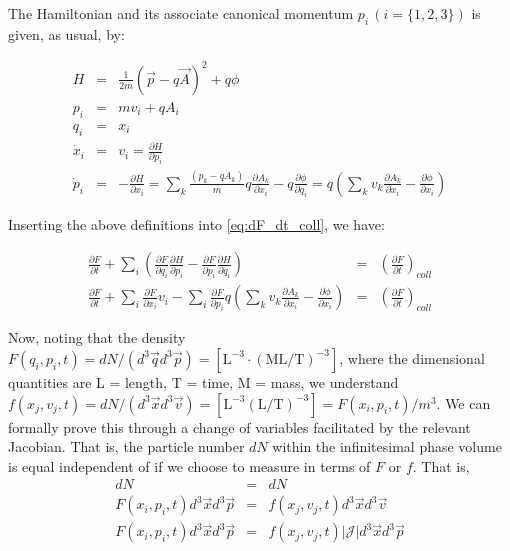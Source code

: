 \documentclass[11pt,titlepage]{report}
\begin{document}
\noindent The Hamiltonian and its associate canonical momentum $p_i \,(i = \{1,2,3\})$ is given, as usual, by:

\begin{eqnarray*}
H & = & \frac{1}{2m}(\vec{p} - q\vec{A})^2 + q\phi \\
p_i & = & mv_i + qA_i \\
q_i & = & x_i \\
\dot{x}_i & = & v_i = \frac{\partial H}{\partial p_i} \\
\dot{p}_i & = & -\frac{\partial H}{\partial x_i} = \sum_k\frac{(p_k - qA_k)}{m} q\frac{\partial A_k}{\partial x_i} - q\frac{\partial \phi }{\partial q_i} = q\left(\sum_kv_k\frac{\partial A_k}{\partial x_i} - \frac{\partial \phi }{\partial x_i}\right)
\end{eqnarray*}

\noindent Inserting the above definitions into \eqref{eq:dF_dt_coll}, we have:

\begin{eqnarray}
\frac{\partial F}{\partial t} + \sum_i \left(\frac{\partial F}{\partial q_i}\frac{\partial H}{\partial p_i} - \frac{\partial F}{\partial p_i}\frac{\partial H}{\partial q_i}\right) & =  & \left(\frac{\partial F}{\partial t}\right)_{coll}  \nonumber \\
\frac{\partial F}{\partial t} + \sum_i \frac{\partial F}{\partial x_i}v_i - \sum_i\frac{\partial F}{\partial p_i}q\left(\sum_kv_k\frac{\partial A_k}{\partial x_i} - \frac{\partial \phi }{\partial x_i}\right) & = & \left(\frac{\partial F}{\partial t}\right)_{coll} \label{eq:dF_dt_coll2}
\end{eqnarray}

Now, noting that the density $F(q_i,p_i,t) = dN / (d^3\vec{q}d^3\vec{p}) = \mathrm{[L^{-3} \cdot (M L/T)^{-3}]}$, where the dimensional quantities are L = length, T = time, M = mass, we understand $f(x_j,v_j,t) = dN / (d^3\vec{x}d^3\vec{v}) = \mathrm{[L^{-3} (L/T)^{-3}]} = F(x_i,p_i,t) / m^3$. We can formally prove this through a change of variables facilitated by the relevant Jacobian. That is, the particle number $dN$ within the infinitesimal phase volume is equal independent of if we choose to measure in terms of $F$ or $f$. That is,
\begin{eqnarray}
dN & = & dN \nonumber \\
F(x_i,p_i,t)d^3\vec{x}d^3\vec{p} & = & f(x_j,v_j,t) d^3\vec{x}d^3\vec{v}\nonumber  \\
F(x_i,p_i,t)d^3\vec{x}d^3\vec{p} & = & f(x_j,v_j,t) |\mathcal{J}| d^3\vec{x}d^3\vec{p} \label{eq:F_f_jacobian}
\end{eqnarray}
\end{document}

